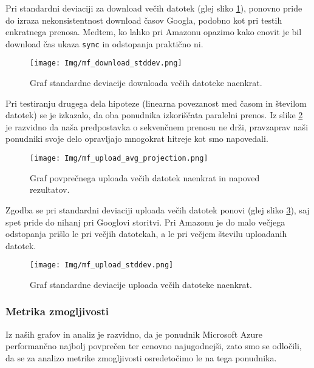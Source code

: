 \documentclass[11pt]{article}
\begin{document}
Pri standardni deviaciji za download večih datotek (glej sliko \ref{fig:graph10}), ponovno pride do izraza nekonsistentnost download časov Googla, podobno kot pri testih enkratnega prenosa. Medtem, ko lahko pri Amazonu opazimo kako enovit je bil download čas ukaza \texttt{sync} in odstopanja praktično ni.

\begin{figure}[H]
    \begin{center}
        \texttt{[image: Img/mf\_download\_stddev.png]}
        \caption{Graf standardne deviacije downloada večih datoteke naenkrat.}
        \label{fig:graph10}
    \end{center}
\end{figure}

Pri testiranju drugega dela hipoteze (linearna povezanost med časom in številom datotek) se je izkazalo, da oba ponudnika izkoriščata paralelni prenos. Iz slike \ref{fig:graph11} je razvidno da naša predpostavka o sekvenčnem prenosu ne drži, pravzaprav naši ponudniki svoje delo opravljajo mnogokrat hitreje kot smo napovedali.

\begin{figure}[H]
    \begin{center}
        \texttt{[image: Img/mf\_upload\_avg\_projection.png]}
        \caption{Graf povprečnega uploada večih datotek naenkrat in napoved rezultatov.}
        \label{fig:graph11}
    \end{center}
\end{figure}

Zgodba se pri standardni deviaciji uploada večih datotek ponovi (glej sliko \ref{fig:graph12}), saj spet pride do nihanj pri Googlovi storitvi. Pri Amazonu je do malo večjega odstopanja prišlo le pri večjih datotekah, a le pri večjem številu uploadanih datotek.

\begin{figure}[H]
    \begin{center}
        \texttt{[image: Img/mf\_upload\_stddev.png]}
        \caption{Graf standardne deviacije uploada večih datoteke naenkrat.}
        \label{fig:graph12}
    \end{center}
\end{figure}

\subsubsection{Metrika zmogljivosti}
Iz naših grafov in analiz je razvidno, da je ponudnik Microsoft Azure performančno najbolj povprečen ter cenovno najugodnejši, zato smo se odločili, da se za analizo metrike zmogljivosti osredetočimo le na tega ponudnika. 
\end{document}
